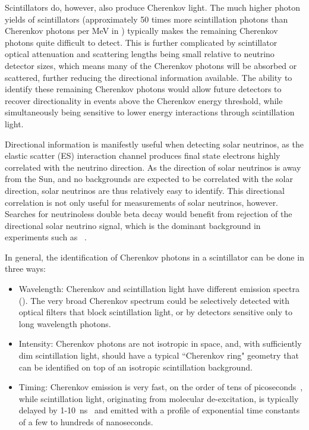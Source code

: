 Scintillators do, however, also produce Cherenkov light. 
The much higher photon yields of scintillators (approximately 50 times more scintillation photons than Cherenkov photons per MeV in {\labppo}) typically makes the remaining Cherenkov photons quite difficult to detect.
This is further complicated by scintillator optical attenuation and scattering lengths being small relative to neutrino detector sizes, which means many of the Cherenkov photons will be absorbed or scattered, further reducing the directional information available.
The ability to identify these remaining Cherenkov photons would allow future detectors to recover directionality in events above the Cherenkov energy threshold, while simultaneously being sensitive to lower energy interactions through scintillation light.

Directional information is manifestly useful when detecting solar neutrinos, as the elastic scatter (ES) interaction channel produces final state electrons highly correlated with the neutrino direction. 
As the direction of solar neutrinos is away from the Sun, and no backgrounds are expected to be correlated with the solar direction, solar neutrinos are thus relatively easy to identify. 
This directional correlation is not only useful for measurements of solar neutrinos, however. Searches for neutrinoless double beta decay would benefit from rejection of the directional solar neutrino signal, which is the dominant background in experiments such as {\snop}~\cite{snop}.

In general, the identification of Cherenkov photons in a scintillator can be done in three ways:
\begin{itemize}
    \item Wavelength:  Cherenkov and scintillation light have different emission spectra (). The very broad Cherenkov spectrum could be selectively detected with optical filters that block scintillation light, or by detectors sensitive only to long wavelength photons.
	\item Intensity: Cherenkov photons are not isotropic in space, and, with sufficiently dim scintillation light, should have a typical ``Cherenkov ring" geometry that can be identified on top of an isotropic scintillation background.
	\item Timing: Cherenkov emission is very fast, on the order of tens of picoseconds~\cite{cherenkov}, while scintillation light, originating from molecular de-excitation, is typically delayed by 1-10~ns~\cite{birks} and emitted with a profile of exponential time constants of a few to hundreds of nanoseconds.
\end{itemize}

